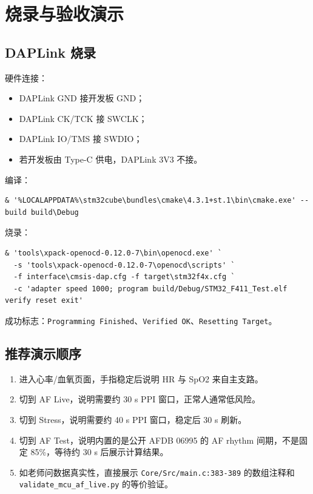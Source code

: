 \documentclass[10.5pt,a4paper,UTF8]{ctexart}
\begin{document}
\section{烧录与验收演示}

\subsection{DAPLink 烧录}

硬件连接：

\begin{itemize}
  \item DAPLink GND 接开发板 GND；
  \item DAPLink CK/TCK 接 SWCLK；
  \item DAPLink IO/TMS 接 SWDIO；
  \item 若开发板由 Type-C 供电，DAPLink 3V3 不接。
\end{itemize}

编译：

\begin{lstlisting}
& '%LOCALAPPDATA%\stm32cube\bundles\cmake\4.3.1+st.1\bin\cmake.exe' --build build\Debug
\end{lstlisting}

烧录：

\begin{lstlisting}
& 'tools\xpack-openocd-0.12.0-7\bin\openocd.exe' `
  -s 'tools\xpack-openocd-0.12.0-7\openocd\scripts' `
  -f interface\cmsis-dap.cfg -f target\stm32f4x.cfg `
  -c 'adapter speed 1000; program build/Debug/STM32_F411_Test.elf verify reset exit'
\end{lstlisting}

成功标志：\texttt{Programming Finished}、\texttt{Verified OK}、\texttt{Resetting Target}。

\subsection{推荐演示顺序}

\begin{enumerate}
  \item 进入心率/血氧页面，手指稳定后说明 HR 与 SpO2 来自主支路。
  \item 切到 AF Live，说明需要约 30 s PPI 窗口，正常人通常低风险。
  \item 切到 Stress，说明需要约 40 s PPI 窗口，稳定后 30 s 刷新。
  \item 切到 AF Test，说明内置的是公开 AFDB 06995 的 AF rhythm 间期，不是固定 85\%，等待约 30 s 后展示计算结果。
  \item 如老师问数据真实性，直接展示 \texttt{Core/Src/main.c:383-389} 的数组注释和 \texttt{validate\_mcu\_af\_live.py} 的等价验证。
\end{enumerate}
\end{document}
